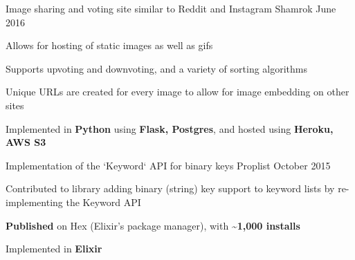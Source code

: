 \begin{cventries}
    \cventry
    {Image sharing and voting site similar to Reddit and Instagram} %
    {Shamrok} %
    {}{June 2016}{
        \begin{cvitems} %
            \item {Allows for hosting of static images as well as gifs}
            \item {Supports upvoting and downvoting, and a variety of sorting algorithms}
            \item {Unique URLs are created for every image to allow for image embedding on other sites}
            \item {Implemented in \textbf{Python} using \textbf{Flask, Postgres}, and hosted using \textbf{Heroku, AWS S3}}
        \end{cvitems}
    }

    \cventry
    {Implementation of the `Keyword` API for binary keys} %
    {Proplist} %
    {}{October 2015}{
        \begin{cvitems} %
            \item {Contributed to library adding binary (string) key support to keyword lists by re-implementing the Keyword API}
            \item {\textbf{Published} on Hex (Elixir's package manager), with \textbf{\textasciitilde1,000 installs}}
            \item {Implemented in \textbf{Elixir}}
        \end{cvitems}
    }

\end{cventries}
